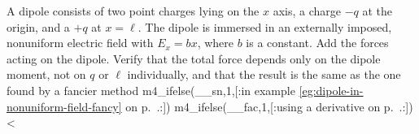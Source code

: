 A dipole consists of two point charges lying on the $x$ axis,                                                     
a charge $-q$ at the origin, and a $+q$ at $x=\ell$.  The dipole is                                               
immersed in an externally imposed, nonuniform electric field with $E_x=bx$, where
$b$ is a constant. Add the forces acting on the dipole. Verify that
the total force depends only on the dipole moment, not on $q$ or $\ell$ individually,
and that the result is the same as the one found by a fancier method 
m4_ifelse(__sn,1,[:in example                                   
        \ref{eg:dipole-in-nonuniform-field-fancy} on p.~\pageref{eg:dipole-in-nonuniform-field-fancy}.:])%
m4_ifelse(__fac,1,[:using a derivative on p.~\pageref{force-on-dipole-in-nonuniform-field}.:])%
<%
